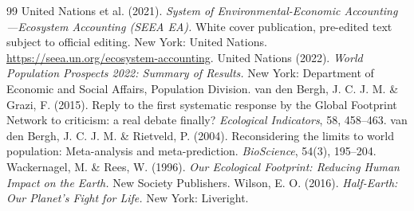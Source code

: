 \documentclass[preprint,12pt,authoryear]{elsarticle}
\begin{document}
\begin{thebibliography}{99}
 United Nations et al. (2021). \emph{System of Environmental-Economic Accounting---Ecosystem Accounting (SEEA EA).} White cover publication, pre-edited text subject to official editing. New York: United Nations. \url{https://seea.un.org/ecosystem-accounting}.
 United Nations (2022). \emph{World Population Prospects 2022: Summary of Results.} New York: Department of Economic and Social Affairs, Population Division.
 van den Bergh, J. C. J. M. \& Grazi, F. (2015). Reply to the first systematic response by the Global Footprint Network to criticism: a real debate finally? \emph{Ecological Indicators}, 58, 458--463.
 van den Bergh, J. C. J. M. \& Rietveld, P. (2004). Reconsidering the limits to world population: Meta-analysis and meta-prediction. \emph{BioScience}, 54(3), 195--204.
 Wackernagel, M. \& Rees, W. (1996). \emph{Our Ecological Footprint: Reducing Human Impact on the Earth.} New Society Publishers.
 Wilson, E. O. (2016). \emph{Half-Earth: Our Planet's Fight for Life.} New York: Liveright.
\end{thebibliography}
\end{document}
